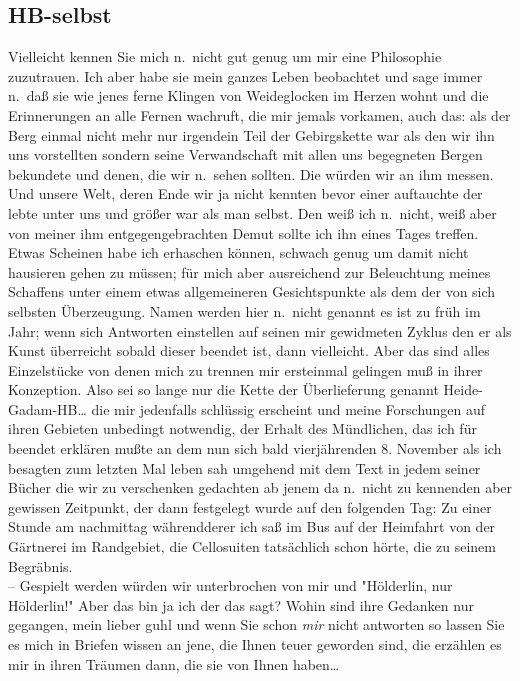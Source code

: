 \documentclass[
]{article}
\author{}
\date{\vspace{-2.5em}}
\begin{document}
\subsection{HB-selbst}\label{hb-selbst}

Vielleicht kennen Sie mich n.~nicht gut genug um mir eine Philosophie
zuzutrauen. Ich aber habe sie mein ganzes Leben beobachtet und sage
immer n.~daß sie wie jenes ferne Klingen von Weideglocken im Herzen
wohnt und die Erinnerungen an alle Fernen wachruft, die mir jemals
vorkamen, auch das: als der Berg einmal nicht mehr nur irgendein Teil
der Gebirgskette war als den wir ihn uns vorstellten sondern seine
Verwandschaft mit allen uns begegneten Bergen bekundete und denen, die
wir n.~sehen sollten. Die würden wir an ihm messen. Und unsere Welt,
deren Ende wir ja nicht kennten bevor einer auftauchte der lebte unter
uns und größer war als man selbst. Den weiß ich n.~nicht, weiß aber von
meiner ihm entgegengebrachten Demut sollte ich ihn eines Tages treffen.
Etwas Scheinen habe ich erhaschen können, schwach genug um damit nicht
hausieren gehen zu müssen; für mich aber ausreichend zur Beleuchtung
meines Schaffens unter einem etwas allgemeineren Gesichtspunkte als dem
der von sich selbsten Überzeugung. Namen werden hier n.~nicht genannt es
ist zu früh im Jahr; wenn sich Antworten einstellen auf seinen mir
gewidmeten Zyklus den er als Kunst überreicht sobald dieser beendet ist,
dann vielleicht. Aber das sind alles Einzelstücke von denen mich zu
trennen mir ersteinmal gelingen muß in ihrer Konzeption. Also sei so
lange nur die Kette der Überlieferung genannt Heide-Gadam-HB\ldots{} die
mir jedenfalls schlüssig erscheint und meine Forschungen auf ihren
Gebieten unbedingt notwendig, der Erhalt des Mündlichen, das ich für
beendet erklären mußte an dem nun sich bald vierjährenden 8. November
als ich besagten zum letzten Mal leben sah umgehend mit dem Text in
jedem seiner Bücher die wir zu verschenken gedachten ab jenem da
n.~nicht zu kennenden aber gewissen Zeitpunkt, der dann festgelegt wurde
auf den folgenden Tag: Zu einer Stunde am nachmittag währendderer ich
saß im Bus auf der Heimfahrt von der Gärtnerei im Randgebiet, die
Cellosuiten tatsächlich schon hörte, die zu seinem Begräbnis.\\
-- Gespielt werden würden wir unterbrochen von mir und "Hölderlin, nur
Hölderlin!" Aber das bin ja ich der das sagt? Wohin sind ihre Gedanken
nur gegangen, mein lieber guhl und wenn Sie schon \emph{mir} nicht
antworten so lassen Sie es mich in Briefen wissen an jene, die Ihnen
teuer geworden sind, die erzählen es mir in ihren Träumen dann, die sie
von Ihnen haben\ldots{}
\end{document}
